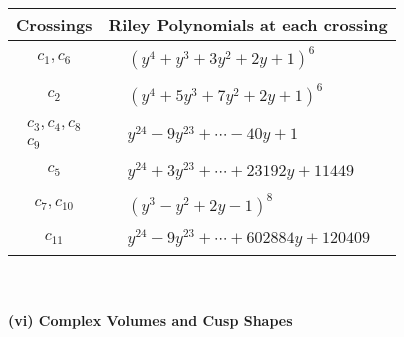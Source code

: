 \documentclass[1p]{elsarticle_modified}
\theoremstyle{definition}
\begin{document}
\begin{tabular}{m{50pt}|m{274pt}}
Crossings & \hspace{64pt}Riley Polynomials at each crossing \\
\hline $$\begin{aligned}c_{1},c_{6}\end{aligned}$$&$\begin{aligned}
&(y^4+y^3+3 y^2+2 y+1)^6
\end{aligned}$\\
\hline $$\begin{aligned}c_{2}\end{aligned}$$&$\begin{aligned}
&(y^4+5 y^3+7 y^2+2 y+1)^6
\end{aligned}$\\
\hline $$\begin{aligned}c_{3},c_{4},c_{8}\\c_{9}\end{aligned}$$&$\begin{aligned}
&y^{24}-9 y^{23}+\cdots-40 y+1
\end{aligned}$\\
\hline $$\begin{aligned}c_{5}\end{aligned}$$&$\begin{aligned}
&y^{24}+3 y^{23}+\cdots+23192 y+11449
\end{aligned}$\\
\hline $$\begin{aligned}c_{7},c_{10}\end{aligned}$$&$\begin{aligned}
&(y^3- y^2+2 y-1)^8
\end{aligned}$\\
\hline $$\begin{aligned}c_{11}\end{aligned}$$&$\begin{aligned}
&y^{24}-9 y^{23}+\cdots+602884 y+120409
\end{aligned}$\\
\hline
\end{tabular}\\~\\
\newpage\flushleft \textbf{(vi) Complex Volumes and Cusp Shapes}
\end{document}
